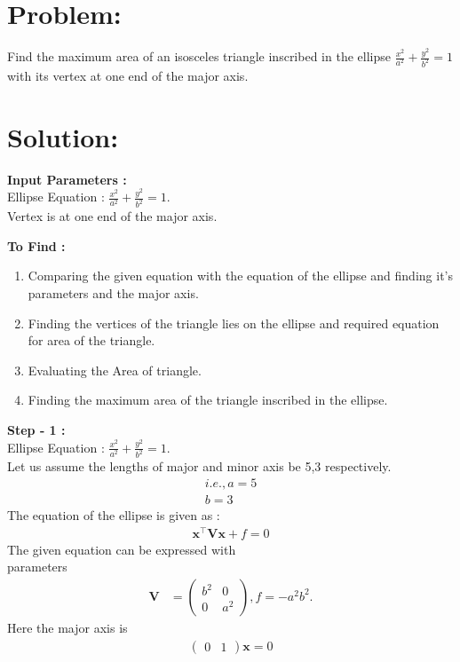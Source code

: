 \documentclass[10pt,a4paper]{report}
\newcommand{\myvec}[1]{\ensuremath{\begin{pmatrix}#1\end{pmatrix}}}
\let\vec\mathbf
\begin{document}
\begin{multicols}{2}

\section{Problem:}  
Find the maximum area of an isosceles triangle inscribed in the ellipse $\frac{x^2}{a^2} + \frac{y^2}{b^2} = 1$ with its vertex at one end of the major axis.

\section{Solution: }

\raggedright \textbf{Input Parameters :}\\ \vspace{2mm}
\centering Ellipse Equation : $\frac{x^2}{a^2} + \frac{y^2}{b^2} = 1$. \\ \vspace{1mm}
Vertex is at one end of the major axis.
\vspace{3mm}

\raggedright \textbf{To Find :}\\ \vspace{2mm}
\begin{enumerate}
\item Comparing the given equation with the equation of the ellipse and finding it's parameters and the major axis.
\item Finding the vertices of the triangle lies on the ellipse and required equation for area of the triangle.
\item Evaluating the Area of triangle.
\item Finding the maximum area of the triangle inscribed in the ellipse.
\end{enumerate}

\raggedright \textbf{Step - 1 :}\\ \vspace{2mm}
Ellipse Equation : $\frac{x^2}{a^2} + \frac{y^2}{b^2} = 1$. \\ \vspace{1mm}
Let us assume the lengths of major and minor axis be 5,3 respectively.
\begin{align*}
i.e., a=5 \\
b=3
\end{align*}
The equation of the ellipse is given as :
\begin{align}
\vec{x}^{\top}\vec{V}\vec{x}+f=0
\end{align}
The given equation can be expressed with \\parameters
\begin{align}
	\vec{V} &= \myvec{b^2 & 0\\0 & a^2}, f = -a^2b^2.
	\end{align}
Here the major axis is 
\begin{align}
\myvec{0&1}\vec{x}=0
\end{align}


\end{multicols}
\end{document}
